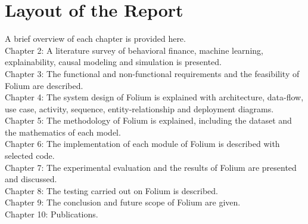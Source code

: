 \section{Layout of the Report}
A brief overview of each chapter is provided here.\\
Chapter 2: A literature survey of behavioral finance, machine learning, explainability, causal modeling and simulation is presented.\\
Chapter 3: The functional and non-functional requirements and the feasibility of Folium are described.\\
Chapter 4: The system design of Folium is explained with architecture, data-flow, use case, activity, sequence, entity-relationship and deployment diagrams.\\
Chapter 5: The methodology of Folium is explained, including the dataset and the mathematics of each model.\\
Chapter 6: The implementation of each module of Folium is described with selected code.\\
Chapter 7: The experimental evaluation and the results of Folium are presented and discussed.\\
Chapter 8: The testing carried out on Folium is described.\\
Chapter 9: The conclusion and future scope of Folium are given.\\
Chapter 10: Publications.

